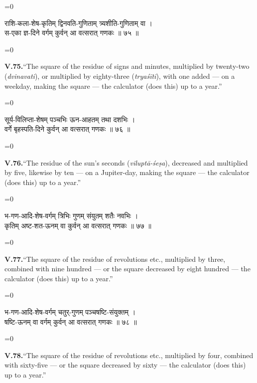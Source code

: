 \documentclass[11pt,a4paper]{article}
\newcommand{\dev}[1]{{\devanagarifont\color{sktcolor}#1}}
\newcommand{\iast}[1]{\textit{#1}}
\newenvironment{paracol}[1]{\begingroup}{\endgroup}
\newcommand{\switchcolumn}[1][]{%
  \ifnum#1=0\relax\else\par\nobreak\vspace{0.5em}\par\nobreak\fi%
}
\begin{document}
\begin{paracol}{2}
\switchcolumn[0]
\dev{%
राशि-कला-शेष-कृतिम् द्विनवति-गुणिताम् त्र्यशीति-गुणिताम् वा ।\\
स-एका ज्ञ-दिने वर्गम् कुर्वन् आ वत्सरात् गणकः ॥ ७५ ॥
}

\switchcolumn[1]
\textbf{V.75.}\quad ``The square of the residue of signs and minutes,
multiplied by twenty-two (\iast{dvinavati}), or multiplied by
eighty-three (\iast{tryaśīti}), with one added — on a weekday,
making the square — the calculator (does this) up to a year.''
\end{paracol}

\vspace{0.3cm}

\begin{paracol}{2}
\switchcolumn[0]
\dev{%
सूर्य-विलिप्ता-शेषम् पञ्चभिः ऊन-आहतम् तथा दशभिः ।\\
वर्गे बृहस्पति-दिने कुर्वन् आ वत्सरात् गणकः ॥ ७६ ॥
}

\switchcolumn[1]
\textbf{V.76.}\quad ``The residue of the sun's seconds
(\iast{viluptā-śeṣa}), decreased and multiplied by five, likewise
by ten — on a Jupiter-day, making the square — the calculator (does
this) up to a year.''
\end{paracol}

\vspace{0.3cm}

\begin{paracol}{2}
\switchcolumn[0]
\dev{%
भ-गण-आदि-शेष-वर्गम् त्रिभिः गुणम् संयुतम् शतैः नवभिः ।\\
कृतिम् अष्ट-शत-ऊनम् वा कुर्वन् आ वत्सरात् गणकः ॥ ७७ ॥
}

\switchcolumn[1]
\textbf{V.77.}\quad ``The square of the residue of revolutions etc.,
multiplied by three, combined with nine hundred — or the square
decreased by eight hundred — the calculator (does this) up to a
year.''
\end{paracol}

\vspace{0.3cm}

\begin{paracol}{2}
\switchcolumn[0]
\dev{%
भ-गण-आदि-शेष-वर्गम् चतुर्-गुणम् पञ्चषष्टि-संयुक्तम् ।\\
षष्टि-ऊनम् वा वर्गम् कुर्वन् आ वत्सरात् गणकः ॥ ७८ ॥
}

\switchcolumn[1]
\textbf{V.78.}\quad ``The square of the residue of revolutions etc.,
multiplied by four, combined with sixty-five — or the square
decreased by sixty — the calculator (does this) up to a year.''
\end{paracol}
\end{document}
